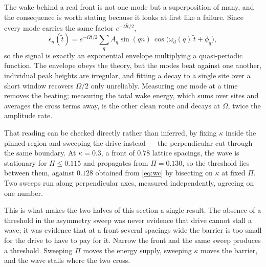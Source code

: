 The wake behind a real front is not one mode but a superposition of many, and the
consequence is worth stating because it looks at first like a failure. Since every
mode carries the same factor $e^{-\Omega\tilde t/2}$,
%
\begin{equation}
  \epsilon_n(\tilde t) = e^{-\Omega\tilde t/2}
  \sum_q A_q \sin(qn)\,\cos\!\big(\omega_d(q)\,\tilde t + \phi_q\big),
  \label{eq:superposition}
\end{equation}
%
so the signal is exactly an exponential envelope multiplying a quasi-periodic
function. The envelope obeys the theory, but the modes beat against one another,
individual peak heights are irregular, and fitting a decay to a single site over a
short window recovers $\Omega/2$ only unreliably. Measuring one mode at a time
removes the beating; measuring the total wake energy, which sums over sites and
averages the cross terms away, is the other clean route and decays at $\Omega$,
twice the amplitude rate.



That reading can be checked directly rather than inferred, by fixing $\kappa$ inside
the pinned region and sweeping the drive instead --- the perpendicular cut through
the same boundary. At $\kappa = 0.3$, a front of $0.78$ lattice spacings, the wave is
stationary for $\Pi \le 0.115$ and propagates from $\Pi = 0.130$, so the threshold
lies between them, against $0.128$ obtained from \eqref{eq:wc} by bisecting on
$\kappa$ at fixed $\Pi$. Two sweeps run along perpendicular axes, measured
independently, agreeing on one number.

This is what makes the two halves of this section a single result. The absence of a
threshold in the asymmetry sweep was never evidence that drive cannot stall a wave;
it was evidence that at a front several spacings wide the barrier is too small for the
drive to have to pay for it. Narrow the front and the same sweep produces a threshold.
Sweeping $\Pi$ moves the energy supply, sweeping $\kappa$ moves the barrier, and the
wave stalls where the two cross.



